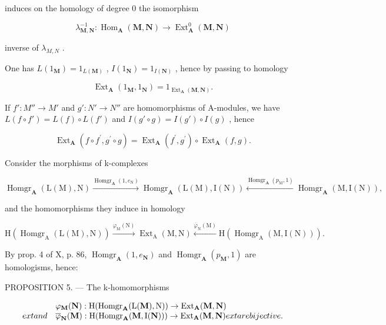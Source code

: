 induces on the homology of degree 0 the isomorphism

\[
\lambda_ {\mathbf {M}, \mathbf {N}} ^ {- 1}: \operatorname{Hom} _ {\mathbf {A}} (\mathbf {M}, \mathbf {N}) \rightarrow \operatorname{Ext} _ {\mathbf {A}} ^ {0} (\mathbf {M}, \mathbf {N})
\]

inverse of \(\lambda_{M,N}\) .

One has \(L(1_{\mathbf{M}}) = 1_{L(\mathbf{M})}\) , \(I(1_{\mathbf{N}}) = 1_{I(\mathbf{N})}\) , hence by passing to homology

\[
\operatorname{Ext} _ {\mathbf {A}} \left(1 _ {\mathbf {M}}, 1 _ {\mathbf {N}}\right) = 1 _ {\operatorname{Ext} _ {\mathbf {A}} (\mathbf {M}, \mathbf {N})}.\tag{8}
\]

If \(f': M'' \to M'\) and \(g': N' \to N''\) are homomorphisms of A-modules, we have \(L(f \circ f') = L(f) \circ L(f')\) and \(I(g' \circ g) = I(g') \circ I(g)\) , hence

\[
\operatorname{Ext} _ {\mathbf {A}} \left(f \circ f ^ {\prime}, g ^ {\prime} \circ g\right) = \operatorname{Ext} _ {\mathbf {A}} \left(f ^ {\prime}, g ^ {\prime}\right) \circ \operatorname{Ext} _ {\mathbf {A}} (f, g).\tag{9}
\]

Consider the morphisms of k-complexes

\[
\operatorname{Homgr} _ {\mathbf {A}} (\mathrm{L} (\mathrm{M}), \mathrm{N}) \xrightarrow {\operatorname{Homgr} _ {\mathbf {A}} (1 , e _ {\mathrm{N}})} \operatorname{Homgr} _ {\mathbf {A}} (\mathrm{L} (\mathrm{M}), \mathrm{I} (\mathrm{N})) \xleftarrow {\operatorname{Homgr} _ {\mathbf {A}} (p _ {\mathrm{M}}, 1)} \operatorname{Homgr} _ {\mathbf {A}} (\mathrm{M}, \mathrm{I} (\mathrm{N})),
\]

and the homomorphisms they induce in homology

\[
\mathrm{H} \left(\operatorname{Homgr} _ {\mathrm{A}} (\mathrm{L} (\mathrm{M}), \mathrm{N})\right) \xrightarrow {\varphi_ {\mathrm{M}} (\mathrm{N})} \operatorname{Ext} _ {\mathrm{A}} (\mathrm{M}, \mathrm{N}) \xleftarrow {\overline {{\varphi}} _ {\mathrm{N}} (\mathrm{M})} \mathrm{H} \left(\operatorname{Homgr} _ {\mathrm{A}} (\mathrm{M}, \mathrm{I} (\mathrm{N}))\right).
\]

By prop. 4 of X, p. 86, \(\operatorname{Homgr}_{\mathbf{A}}(1, e_{\mathbf{N}})\) and \(\operatorname{Homgr}_{\mathbf{A}}(p_{\mathbf{M}}, 1)\) are homologisms, hence:

PROPOSITION 5. --- The k-homomorphisms

\[
\begin{array}{l l} & \varphi_ {\mathbf {M}} (\mathbf {N}): \mathrm{H} (\mathrm{Homgr} _ {\mathbf {A}}   (\mathrm{L} (\mathbf {M}), \mathrm{N})) \to \mathrm{Ext} _ {\mathbf {A}}   (\mathbf {M}, \mathbf {N}) \\ 	ext{and} & \overline {{\varphi}} _ {\mathbf {N}} (\mathbf {M}): \mathrm{H} (\mathrm{Homgr} _ {\mathbf {A}}   (\mathbf {M}, \mathrm{I} (\mathbf {N}))) \to \mathrm{Ext} _ {\mathbf {A}}   (\mathbf {M}, \mathbf {N}) 	ext{are bijective.} \end{array}
\]

